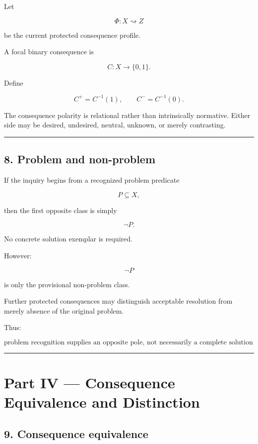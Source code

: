 \documentclass[
]{article}
\begin{document}
Let

\[
\Phi:X\rightsquigarrow Z
\]

be the current protected consequence profile.

A focal binary consequence is

\[
C:X\to\{0,1\}.
\]

Define

\[
C^+=C^{-1}(1),
\qquad
C^-=C^{-1}(0).
\]

The consequence polarity is relational rather than intrinsically
normative. Either side may be desired, undesired, neutral, unknown, or
merely contrasting.

\begin{center}\rule{0.5\linewidth}{0.5pt}\end{center}

\subsection{8. Problem and non-problem}\label{problem-and-non-problem}

If the inquiry begins from a recognized problem predicate

\[
P\subseteq X,
\]

then the first opposite class is simply

\[
\boxed{
\neg P.
}
\]

No concrete solution exemplar is required.

However:

\[
\neg P
\]

is only the provisional non-problem class.

Further protected consequences may distinguish acceptable resolution
from merely absence of the original problem.

Thus:

\[
\boxed{
\text{problem recognition supplies an opposite pole,
not necessarily a complete solution specification.}
}
\]

\begin{center}\rule{0.5\linewidth}{0.5pt}\end{center}

\section{Part IV --- Consequence Equivalence and
Distinction}\label{part-iv-consequence-equivalence-and-distinction}

\subsection{9. Consequence equivalence}\label{consequence-equivalence}
\end{document}
